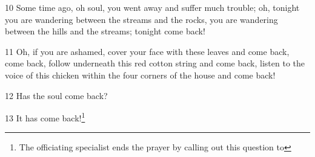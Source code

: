 10 Some time ago, oh soul, you went away and suffer much trouble; oh, tonight you
are wandering between the streams and the rocks, you are wandering between the
hills and the streams; tonight come back!

11 Oh, if you are ashamed, cover your face with these leaves and come back, come
back, follow underneath this red cotton string and come back, listen to the voice
of this chicken within the four corners of the house and come back!

12 Has the soul come back?

13 It has come back!\footnote{The officiating specialist ends the prayer by calling out this question to}

